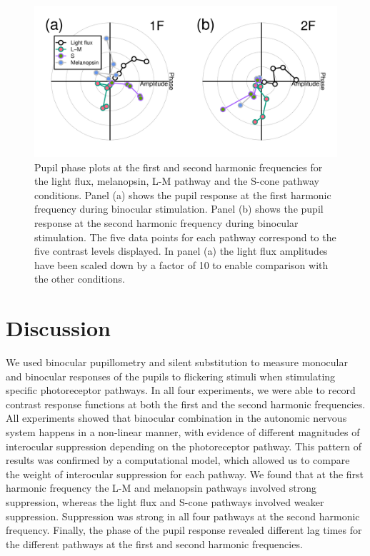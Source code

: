 \documentclass[
]{article}
\begin{document}
\begin{figure}

{\centering \includegraphics{Figures/phaseplots} 

}

\caption{Pupil phase plots at the first and second harmonic frequencies for the light flux, melanopsin, L-M pathway and the S-cone pathway conditions. Panel (a) shows the pupil response at the first harmonic frequency during binocular stimulation. Panel (b) shows the pupil response at the second harmonic frequency during binocular stimulation. The five data points for each pathway correspond to the five contrast levels displayed. In panel (a) the light flux amplitudes have been scaled down by a factor of 10 to enable comparison with the other conditions.}\label{fig:phaseplots}
\end{figure}

\section{Discussion}\label{discussion}

We used binocular pupillometry and silent substitution to measure monocular and binocular responses of the pupils to flickering stimuli when stimulating specific photoreceptor pathways. In all four experiments, we were able to record contrast response functions at both the first and the second harmonic frequencies. All experiments showed that binocular combination in the autonomic nervous system happens in a non-linear manner, with evidence of different magnitudes of interocular suppression depending on the photoreceptor pathway. This pattern of results was confirmed by a computational model, which allowed us to compare the weight of interocular suppression for each pathway. We found that at the first harmonic frequency the L-M and melanopsin pathways involved strong suppression, whereas the light flux and S-cone pathways involved weaker suppression. Suppression was strong in all four pathways at the second harmonic frequency. Finally, the phase of the pupil response revealed different lag times for the different pathways at the first and second harmonic frequencies.
\end{document}
